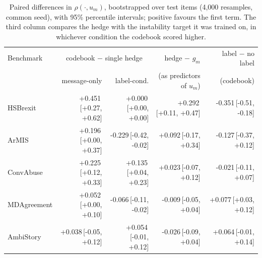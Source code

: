 \begin{table}[t]
\centering
\small
\begin{tabular}{lrrrr}
\hline
Benchmark & \multicolumn{2}{c}{codebook $-$ single hedge} & hedge $-$ $g_m$ & label $-$ no label \\
 & message-only & label-cond. & (as predictors of $u_m$) & (codebook) \\
\hline
HSBrexit & +0.451{\scriptsize\,[+0.27, +0.62]} & +0.000{\scriptsize\,[+0.00, +0.00]} & +0.292{\scriptsize\,[+0.11, +0.47]} & -0.351{\scriptsize\,[-0.51, -0.18]} \\
ArMIS & +0.196{\scriptsize\,[+0.00, +0.37]} & -0.229{\scriptsize\,[-0.42, -0.02]} & +0.092{\scriptsize\,[-0.17, +0.34]} & -0.127{\scriptsize\,[-0.37, +0.12]} \\
ConvAbuse & +0.225{\scriptsize\,[+0.12, +0.33]} & +0.135{\scriptsize\,[+0.04, +0.23]} & +0.023{\scriptsize\,[-0.07, +0.12]} & -0.021{\scriptsize\,[-0.11, +0.07]} \\
MDAgreement & +0.052{\scriptsize\,[+0.00, +0.10]} & -0.066{\scriptsize\,[-0.11, -0.02]} & -0.009{\scriptsize\,[-0.05, +0.04]} & +0.077{\scriptsize\,[+0.03, +0.12]} \\
AmbiStory & +0.038{\scriptsize\,[-0.05, +0.12]} & +0.054{\scriptsize\,[-0.01, +0.12]} & -0.026{\scriptsize\,[-0.09, +0.04]} & +0.064{\scriptsize\,[-0.01, +0.14]} \\
\hline
\end{tabular}
\caption{Paired differences in $\rho(\cdot,u_m)$, bootstrapped over test items (4,000 resamples, common seed), with 95\% percentile intervals; positive favours the first term. The third column compares the hedge with the instability target it was trained on, in whichever condition the codebook scored higher.}
\label{tab:paired}
\end{table}